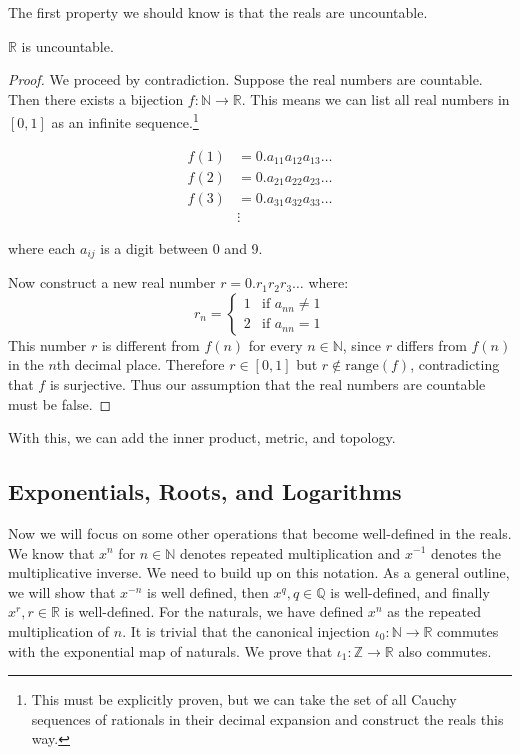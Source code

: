   The first property we should know is that the reals are uncountable. 

  \begin{theorem}
    $\mathbb{R}$ is uncountable.
  \end{theorem}
  \begin{proof}
    We proceed by contradiction. Suppose the real numbers are countable. Then there exists a bijection $f: \mathbb{N} \to \mathbb{R}$. This means we can list all real numbers in $[0,1]$ as an infinite sequence.\footnote{This must be explicitly proven, but we can take the set of all Cauchy sequences of rationals in their decimal expansion and construct the reals this way.}
    
    \begin{align}
      f(1) &= 0.a_{11}a_{12}a_{13}\dots \\
      f(2) &= 0.a_{21}a_{22}a_{23}\dots \\
      f(3) &= 0.a_{31}a_{32}a_{33}\dots \\
      &\vdots
    \end{align}
    
    where each $a_{ij}$ is a digit between 0 and 9.
    
    Now construct a new real number $r = 0.r_1r_2r_3\dots$ where:
    \begin{equation}
      r_n = \begin{cases}
        1 & \text{if } a_{nn} \neq 1 \\
        2 & \text{if } a_{nn} = 1
      \end{cases}
    \end{equation}
    This number $r$ is different from $f(n)$ for every $n \in \mathbb{N}$, since $r$ differs from $f(n)$ in the $n$th decimal place. Therefore $r \in [0,1]$ but $r \notin \text{range}(f)$, contradicting that $f$ is surjective. Thus our assumption that the real numbers are countable must be false.
  \end{proof}

  With this, we can add the inner product, metric, and topology. 

\subsection{Exponentials, Roots, and Logarithms} 

  Now we will focus on some other operations that become well-defined in the reals. We know that $x^{n}$ for $n \in \mathbb{N}$ denotes repeated multiplication and $x^{-1}$ denotes the multiplicative inverse. We need to build up on this notation. As a general outline, we will show that $x^{-n}$ is well defined, then $x^q, q \in \mathbb{Q}$ is well-defined, and finally $x^r, r \in \mathbb{R}$ is well-defined. For the naturals, we have defined $x^n$ as the repeated multiplication of $n$. It is trivial that the canonical injection $\iota_0: \mathbb{N} \rightarrow \mathbb{R}$ commutes with the exponential map of naturals. We prove that $\iota_1: \mathbb{Z} \rightarrow \mathbb{R}$ also commutes. 

